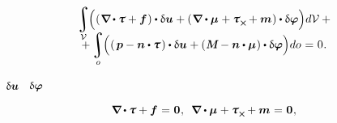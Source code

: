 \begin{otherlanguage}{russian}
\nopagebreak\vspace{-0.33em}
\begin{multline*}\label{virtualworkprinciple.2:micropolarcontinuum}
\integral\displaylimits_{\mathcal{V}} \hspace{-0.64ex} \left(^{\mathstrut} ( \hspace{.12ex} \boldnabla \hspace{-0.1ex} \dotp \forcestresstensor + \bm{f} \hspace{.12ex} ) \dotp \variation{\fieldofdisplacements} \hspace{.1ex}
+ ( \hspace{.12ex} \boldnabla \dotp \couplestresstensor \hspace{.1ex} + \forcestresstensor_{\Xcompanion} \hspace{-0.1ex} + \bm{m} \hspace{.1ex} ) \dotp \variation{\fieldofrotations} \right) \hspace{-0.32ex} d\mathcal{V} \hspace{0.5ex} + \\[-1.1em]
%
+ \integral\displaylimits_o \hspace{-0.64ex} \left(^{\mathstrut} ( \hspace{.32ex} \bm{p} - \bm{n} \dotp \forcestresstensor \hspace{.2ex} ) \dotp \variation{\fieldofdisplacements} \hspace{.1ex}
+ ( \hspace{.1ex} \mathboldM - \bm{n} \dotp \couplestresstensor \hspace{.1ex} ) \dotp \variation{\fieldofrotations} \right) \hspace{-0.32ex} do \hspace{.12ex} = \hspace{.1ex} 0 \hspace{.1ex}.
\end{multline*}

 ~$\updelta\hspace{-0.1ex}\bm{u}$ ~$\updelta\hspace{-0.1ex}\bm{\varphi}$     ~

\nopagebreak\vspace{-0.15em}\begin{equation}\label{micropolar.equilibrium:cauchy-like}
\boldnabla \hspace{-0.1ex} \dotp \forcestresstensor + \bm{f} \hspace{.12ex} = \hspace{.1ex} \bm{0}
\hspace{.1ex} ,
\:\;
\boldnabla \dotp \couplestresstensor \hspace{.1ex} + \forcestresstensor_{\Xcompanion} \hspace{-0.1ex} + \bm{m} \hspace{.1ex} = \hspace{.1ex} \bm{0}
\hspace{.1ex} ,
\end{equation}


\end{otherlanguage}
